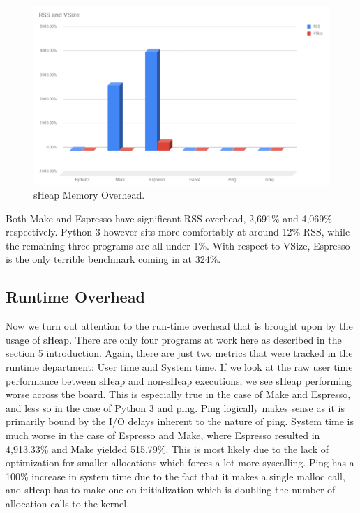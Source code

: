\documentclass[conference]{IEEEtran}
\begin{document}
\begin{figure}[htbp]
  \centering
  \includegraphics[width=\linewidth]{sheap-mem-overhead-graph.png}
  \caption{sHeap Memory Overhead.}
  \label{fig:sheap-mem-overhead-graph}
\end{figure}

Both Make and Espresso have significant RSS overhead, 2,691\% and 4,069\% respectively. Python 3 
however sits more comfortably at around 12\% RSS, while the remaining three programs are all 
under 1\%. With respect to VSize, Espresso is the only terrible benchmark coming in at 324\%.

\subsection{Runtime Overhead}
Now we turn out attention to the run-time overhead that is brought upon by the usage of sHeap. 
There are only four programs at work here as described in the section 5 introduction. Again, 
there are just two metrics that were tracked in the runtime department: User time and System 
time. If we look at the raw user time performance between sHeap and non-sHeap executions, we 
see sHeap performing worse across the board. This is especially true in the case of Make and 
Espresso, and less so in the case of Python 3 and ping. Ping logically makes sense as it is 
primarily bound by the I/O delays inherent to the nature of ping. System time is much worse 
in the case of Espresso and Make, where Espresso resulted in 4,913.33\% and Make yielded 
515.79\%. This is most likely  due to the lack of optimization for smaller allocations which 
forces a lot more syscalling. Ping has a 100\% increase in system time due to the fact that 
it makes a single malloc call, and sHeap has to make one on initialization which is doubling 
the number of allocation calls to the kernel. 
\end{document}

